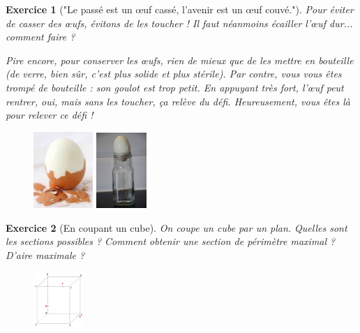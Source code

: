 \documentclass[12pt]{article}
\theoremstyle{break}
\newtheorem{exo}{Exercice}
\begin{document}
\begin{exo}["Le passé est un œuf cassé, l'avenir est un œuf couvé."]
Pour éviter de casser des œufs, évitons de les toucher ! Il faut néanmoins écailler l’œuf dur... comment faire ?

Pire encore, pour conserver les œufs, rien de mieux que de les mettre en bouteille (de verre, bien sûr, c'est plus solide et plus stérile). Par contre, vous vous êtes trompé de bouteille : son goulot est trop petit. En appuyant très fort, l’œuf peut rentrer, oui, mais sans les toucher, ça relève du défi. Heureusement, vous êtes là pour relever ce défi !


\begin{figure}[h!]
	\centering
    \includegraphics[width=0.2\textwidth]{OeufEcaille.jpg}
    \includegraphics[width=0.17\textwidth]{OeufEnBouteille.jpg}
\end{figure}
\end{exo}


\begin{exo}[En coupant un cube]
On coupe un cube par un plan. Quelles sont les sections possibles ? Comment obtenir une section de périmètre maximal ? D'aire maximale ?

\begin{figure}[h!]
	\centering
    \includegraphics[width=0.17\textwidth]{Cube.png}
    
\end{figure}
\end{exo}
\end{document}
